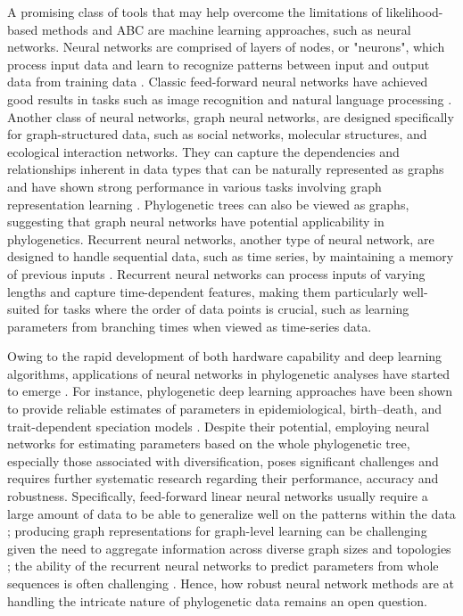 {A promising class of tools that may help overcome the limitations of likelihood-based methods and ABC are machine learning approaches, such as neural networks. Neural networks are comprised of layers of nodes, or "neurons", which process input data and learn to recognize patterns between input and output data from training data \citep{aggarwal_neural_2018}. Classic feed-forward neural networks have achieved good results in tasks such as image recognition and natural language processing \citep{zhu_benchmarking_2018}. Another class of neural networks, graph neural networks, are designed specifically for graph-structured data, such as social networks, molecular structures, and ecological interaction networks. They can capture the dependencies and relationships inherent in data types that can be naturally represented as graphs \citep{kipf_semi-supervised_2016} and have shown strong performance in various tasks involving graph representation learning \citep{rampasek_recipe_2022, ying_hierarchical_2018, li_deepergcn_2020}. Phylogenetic trees can also be viewed as graphs, suggesting that graph neural networks have potential applicability in phylogenetics. Recurrent neural networks, another type of neural network, are designed to handle sequential data, such as time series, by maintaining a memory of previous inputs \citep{salehinejad_recent_2017, sak_long_2014}. Recurrent neural networks can process inputs of varying lengths and capture time-dependent features, making them particularly well-suited for tasks where the order of data points is crucial, such as learning parameters from branching times when viewed as time-series data.

Owing to the rapid development of both hardware capability and deep learning algorithms, applications of neural networks in phylogenetic analyses have started to emerge \citep{dopazo_phylogenetic_1997,tao_machine_2019,suvorov_accurate_2020,zou_deep_2020,moi_reconstructing_2022, reiman_popphy-cnn_2020, voznica_deep_2022, lambert_deep_2023, lajaaiti_comparison_2023,suvorov_reliable_2024}. For instance, phylogenetic deep learning approaches have been shown to provide reliable estimates of parameters in epidemiological, birth--death, and trait-dependent speciation models \citep{lambert_deep_2023, voznica_deep_2022, lajaaiti_comparison_2023, thompson_deep_2024}. Despite their potential, employing neural networks for estimating parameters based on the whole phylogenetic tree, especially those associated with diversification, poses significant challenges and requires further systematic research regarding their performance, accuracy and robustness. Specifically, feed-forward linear neural networks usually require a large amount of data to be able to generalize well on the patterns within the data \citep{zhu_benchmarking_2018}; producing graph representations for graph-level learning can be challenging given the need to aggregate information across diverse graph sizes and topologies \citep{ying_hierarchical_2018}; the ability of the recurrent neural networks to predict parameters from whole sequences is often challenging \citep{sak_long_2014}. Hence, how robust neural network methods are at handling the intricate nature of phylogenetic data remains an open question.

}
